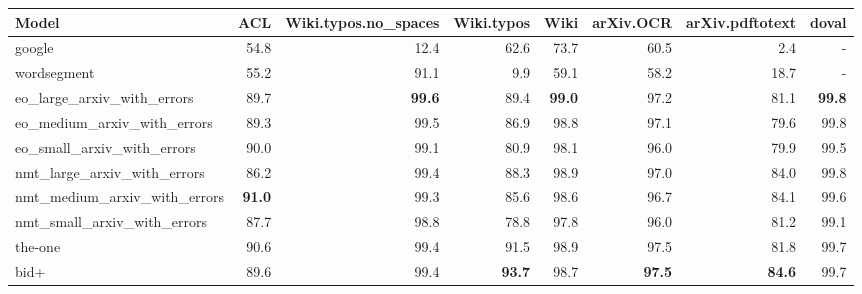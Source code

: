 \begin{tabular}{lrrrrrrr} \hline
Model & ACL & Wiki.typos.no\_spaces & Wiki.typos & Wiki & arXiv.OCR & arXiv.pdftotext & doval \\ \hline
google & 54.8 & 12.4 & 62.6 & 73.7 & 60.5 & 2.4 & - \\ 
wordsegment & 55.2 & 91.1 & 9.9 & 59.1 & 58.2 & 18.7 & - \\ \hline
eo\_large\_arxiv\_with\_errors & 89.7 & \textbf{99.6} & 89.4 & \textbf{99.0} & 97.2 & 81.1 & \textbf{99.8} \\ 
eo\_medium\_arxiv\_with\_errors & 89.3 & 99.5 & 86.9 & 98.8 & 97.1 & 79.6 & 99.8 \\ 
eo\_small\_arxiv\_with\_errors & 90.0 & 99.1 & 80.9 & 98.1 & 96.0 & 79.9 & 99.5 \\ \hline
nmt\_large\_arxiv\_with\_errors & 86.2 & 99.4 & 88.3 & 98.9 & 97.0 & 84.0 & 99.8 \\ 
nmt\_medium\_arxiv\_with\_errors & \textbf{91.0} & 99.3 & 85.6 & 98.6 & 96.7 & 84.1 & 99.6 \\ 
nmt\_small\_arxiv\_with\_errors & 87.7 & 98.8 & 78.8 & 97.8 & 96.0 & 81.2 & 99.1 \\ \hline
the-one & 90.6 & 99.4 & 91.5 & 98.9 & 97.5 & 81.8 & 99.7 \\ 
bid+ & 89.6 & 99.4 & \textbf{93.7} & 98.7 & \textbf{97.5} & \textbf{84.6} & 99.7 \\ \hline
\end{tabular}